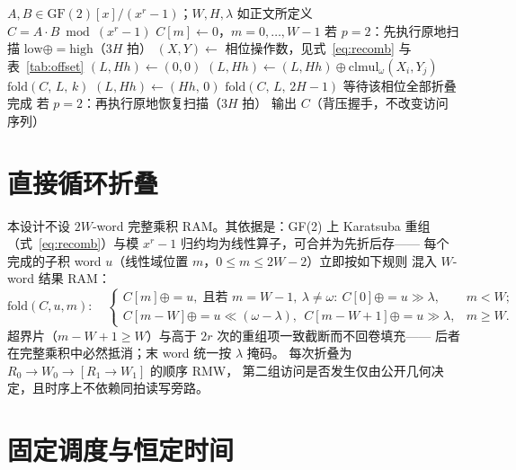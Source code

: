 \documentclass{article}
\newcommand{\wop}{\omega}
\begin{document}
\begin{algorithm}[htbp]
\caption{固定调度一层 Karatsuba-Comba 直接循环折叠}
\label{alg:fold}
\begin{algorithmic}[1]
\Require $A,B\in\mathrm{GF}(2)[x]/(x^r-1)$；$W,H,\lambda$ 如正文所定义
\Ensure $C=A\cdot B \bmod (x^r-1)$
\State $C[m]\gets 0$，$m=0,\dots,W-1$ 
 
  \State 若 $p=2$：先执行原地扫描 $\mathrm{low}\oplus{=}\mathrm{high}$（$3H$ 拍）
  \State $(X,Y)\gets$ 相位操作数，见式~\eqref{eq:recomb} 与表~\ref{tab:offset}
  \State $(L,Hh)\gets(0,0)$
      \State $(L,Hh)\gets(L,Hh)\oplus\mathrm{clmul}_{\wop}(X_i,Y_j)$ 
    \EndFor
    \State $\mathrm{fold}(C,\,L,\,k)$ 
    \State $(L,Hh)\gets(Hh,\,0)$ 
  \EndFor
  \State $\mathrm{fold}(C,\,L,\,2H-1)$ 
  \State 等待该相位全部折叠完成
  \State 若 $p=2$：再执行原地恢复扫描（$3H$ 拍）
\EndFor
\State 输出 $C$（背压握手，不改变访问序列）
\end{algorithmic}
\end{algorithm}

\section{直接循环折叠}

本设计不设 $2W$-word 完整乘积 RAM。其依据是：GF(2) 上 Karatsuba 重组
（式~\eqref{eq:recomb}）与模 $x^r-1$ 归约均为线性算子，可合并为先折后存——
每个完成的子积 word $u$（线性域位置 $m$，$0\le m\le 2W-2$）立即按如下规则
混入 $W$-word 结果 RAM：
\begin{equation}
\mathrm{fold}(C,u,m):\quad
\begin{cases}
C[m]\oplus= u, \;\text{且若 } m=W{-}1,\ \lambda\ne\wop:\ C[0]\oplus= u\gg\lambda, & m<W; \\[2pt]
C[m{-}W]\oplus= u\ll(\wop{-}\lambda),\ \ C[m{-}W{+}1]\oplus= u\gg\lambda, & m\ge W.
\end{cases}
\label{eq:fold}
\end{equation}
超界片（$m{-}W{+}1\ge W$）与高于 $2r$ 次的重组项一致截断而不回卷填充——
后者在完整乘积中必然抵消；末 word 统一按 $\lambda$ 掩码。
每次折叠为 $R_0{\to}W_0{\to}[R_1{\to}W_1]$ 的顺序 RMW，
第二组访问是否发生仅由公开几何决定，且时序上不依赖同拍读写旁路。

\section{固定调度与恒定时间}
\end{document}
